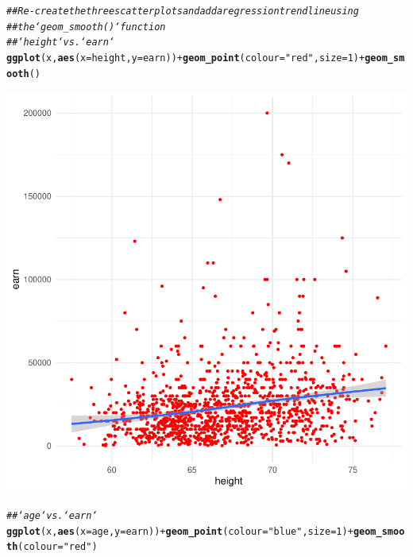 \documentclass{article}\usepackage[]{graphicx}\usepackage[]{xcolor}
\makeatletter
\newcommand{\hlnum}[1]{\textcolor[rgb]{0.686,0.059,0.569}{#1}}%
\newcommand{\hlstr}[1]{\textcolor[rgb]{0.192,0.494,0.8}{#1}}%
\newcommand{\hlcom}[1]{\textcolor[rgb]{0.678,0.584,0.686}{\textit{#1}}}%
\newcommand{\hlopt}[1]{\textcolor[rgb]{0,0,0}{#1}}%
\newcommand{\hlstd}[1]{\textcolor[rgb]{0.345,0.345,0.345}{#1}}%
\newcommand{\hlkwc}[1]{\textcolor[rgb]{0.333,0.667,0.333}{#1}}%
\newcommand{\hlkwd}[1]{\textcolor[rgb]{0.737,0.353,0.396}{\textbf{#1}}}%
\newenvironment{kframe}{%
 \def\at@end@of@kframe{}%
 \ifinner\ifhmode%
  \def\at@end@of@kframe{\end{minipage}}%
  \begin{minipage}{\columnwidth}%
 \fi\fi%
 \def\FrameCommand##1{\hskip\@totalleftmargin \hskip-\fboxsep
 \colorbox{shadecolor}{##1}\hskip-\fboxsep
     \hskip-\linewidth \hskip-\@totalleftmargin \hskip\columnwidth}%
 \MakeFramed {\advance\hsize-\width
   \@totalleftmargin\z@ \linewidth\hsize
   \@setminipage}}%
 {\par\unskip\endMakeFramed%
 \at@end@of@kframe}
\newenvironment{knitrout}{}{} %
\makeatother
\begin{document}
\begin{knitrout}
{}


\begin{kframe}\begin{alltt}
\hlcom{## Re-create the three scatterplots and add a regression trend line using}
\hlcom{## the `geom_smooth()` function}
\hlcom{## `height` vs. `earn`}
\hlkwd{ggplot}\hlstd{(x,} \hlkwd{aes}\hlstd{(}\hlkwc{x}\hlstd{=height,} \hlkwc{y}\hlstd{=earn))} \hlopt{+} \hlkwd{geom_point}\hlstd{(}\hlkwc{colour} \hlstd{=} \hlstr{"red"}\hlstd{,} \hlkwc{size} \hlstd{=} \hlnum{1}\hlstd{)} \hlopt{+} \hlkwd{geom_smooth}\hlstd{()}
\end{alltt}


{\ttfamily\noindent\itshape{}}\end{kframe}

{\centering \includegraphics[width=.6\linewidth]{figure/assignment-03-SyversonLuke-Rnwauto-report-4} 

}


\begin{kframe}\begin{alltt}
\hlcom{## `age` vs. `earn`}
\hlkwd{ggplot}\hlstd{(x,} \hlkwd{aes}\hlstd{(}\hlkwc{x}\hlstd{=age,} \hlkwc{y}\hlstd{=earn))} \hlopt{+} \hlkwd{geom_point}\hlstd{(}\hlkwc{colour} \hlstd{=} \hlstr{"blue"}\hlstd{,} \hlkwc{size} \hlstd{=} \hlnum{1}\hlstd{)} \hlopt{+} \hlkwd{geom_smooth}\hlstd{(}\hlkwc{colour} \hlstd{=} \hlstr{"red"}\hlstd{)}
\end{alltt}


{\ttfamily\noindent\itshape{}}\end{kframe}


\end{knitrout}
\end{document}
